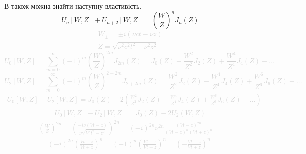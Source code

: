 В \cite{Boersma1961} також можна знайти наступну властивість.
%
\begin{equation}
U_n \left[ W, Z \right] + U_{n+2} \left[ W, Z \right] = 
\left( \frac{W}{Z} \right)^n J_n (Z)
\end{equation}
%
\textcolor{lightgray} { \begin{equation*} \begin{aligned}
W_\pm = \pm i (\nu ct - \nu z) \\
Z = \sqrt{\nu^2 c^2t^2 - \nu^2 z^2}
\end{aligned} \end{equation*} }
%
\textcolor{lightgray}{ \begin{equation*}
U_0 \left[ W, Z \right] = \sum \limits_{m = 0}^{\infty} (-1)^m
\left( \frac{W}{Z} \right)^{2m} J_{2m} (Z) = J_0 (Z) - \frac{W^2}{Z^2} J_2 (Z) +
\frac{W^4}{Z^4} J_4 (Z) - ...
\end{equation*} }
%
\textcolor{lightgray}{ \begin{equation*}
U_2 \left[ W, Z \right] = \sum \limits_{m = 0}^{\infty} (-1)^m
\left( \frac{W}{Z} \right)^{2 + 2m} J_{2 + 2m} (Z) = 
\frac{W^2}{Z^2} J_2 (Z) - \frac{W^4}{Z^4} J_4 (Z) + \frac{W^6}{Z^6} J_6 (Z) - ...
\end{equation*} }
%
\textcolor{lightgray}{ \begin{equation*} \begin{aligned}
U_0 [W, Z] - U_2 [W, Z] = J_0(Z) - 2 \left( \frac{W^2}{Z^2} J_2 (Z) - 
\frac{W^4}{Z^4} J_4 (Z) + \frac{W^6}{Z^6} J_6 (Z) - ... \right)
\end{aligned} \end{equation*} }
%
\textcolor{lightgray}{ \begin{equation*} \begin{aligned}
U_0 [W, Z] - U_2 [W, Z] = J_0(Z) - 2 U_2(W,Z)
\end{aligned} \end{equation*} }
%
\textcolor{lightgray}{ \begin{equation*} \begin{aligned}
\left( \frac{W}{Z} \right)^{2n} = \left( 
\frac{- i \nu (\mathit{V}t - z)}
{\nu \sqrt{\mathit{V}^2t^2 - z^2}} \right)^{2n} = 
(-i)^{2n} \nu^{2n} \frac{(\mathit{V}t - z)^{2n}}
{(\mathit{V}t - z)^n (\mathit{V}t + z)^n} = \\
= (-i)^{2n} \left( \frac{\mathit{V}t - z}{\mathit{V}t + z} \right)^n = 
(-1)^{n} \left( \frac{\mathit{V}t - z}{\mathit{V}t + z} \right)^n = 
\left( - \frac{\mathit{V}t - z}{\mathit{V}t + z} \right)^n
\end{aligned} \end{equation*} }
